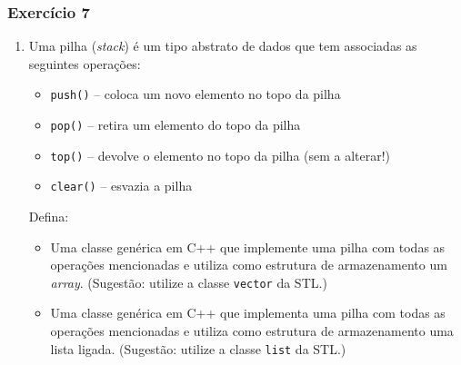 \documentclass[xcolor={dvipsnames,table},aspectratio=169]{beamer}
\newcommand\setItemnumber[1]{\setcounter{enumi}{\numexpr#1-1\relax}}
\begin{document}
\begin{frame}[fragile]\frametitle{Exercício 7}
\begin{enumerate}
	\setItemnumber{7}
	\item Uma pilha (\emph{stack}) é um tipo abstrato de dados que tem associadas as seguintes operações:\\
	\begin{itemize}
		\item \texttt{push()} -- coloca um novo elemento no topo da pilha
		\item \texttt{pop()} -- retira um elemento do topo da pilha
		\item \texttt{top()} -- devolve o elemento no topo da pilha (sem a alterar!)
		\item \texttt{clear()} -- esvazia a pilha
	\end{itemize}
	Defina:\\
	\begin{itemize}
		\item Uma classe genérica em C++ que implemente uma pilha com todas as operações mencionadas e utiliza como estrutura de armazenamento um \emph{array}. (Sugestão: utilize a classe \texttt{vector} da STL.)
		\item Uma classe genérica em C++ que implementa uma pilha com todas as operações mencionadas e utiliza como estrutura de armazenamento uma lista ligada. (Sugestão: utilize a classe \texttt{list} da STL.)
	\end{itemize}
\end{enumerate}
\end{frame}
\end{document}
